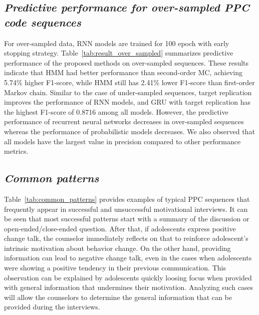 \documentclass{amia_summit_2018}
\begin{document}
\subsection*{\textit{Predictive performance for over-sampled PPC code sequences}}
For over-sampled data, RNN models are trained for 100 epoch with early stopping strategy. Table~\ref{tab:result_over_sampled} summarizes predictive performance of the proposed methods on over-sampled sequences. These results indicate that HMM had better performance than second-order MC, achieving 5.74\% higher F1-score, while HMM still has 2.41\% lower F1-score than first-order Markov chain. Similar to the case of under-sampled sequences, target replication improves the performance of RNN models, and GRU with target replication has the highest F1-score of 0.8716 among all models. However, the predictive performance of recurrent neural networks decreases in over-sampled sequences whereas the performance of probabilistic models decreases. We also observed that all models have the largest value in precision compared to other performance metrics.

\subsection*{\textit{Common patterns}}
Table~\ref{tab:common_patterns} provides examples of typical PPC sequences that frequently appear in successful and unsuccessful motivational interviews. It can be seen that most successful patterns start with a summary of the discussion or open-ended/close-ended question. After that, if adolescents express positive change talk, the counselor immediately reflects on that to reinforce adolescent's intrinsic motivation about behavior change. On the other hand, providing information can lead to negative change talk, even in the cases when adolescents were showing a positive tendency in their previous communication. This observation can be explained by adolescents quickly loosing focus when provided with general information that undermines their motivation. Analyzing such cases will allow the counselors to determine the general information that can be provided during the interviews. \\
\end{document}
